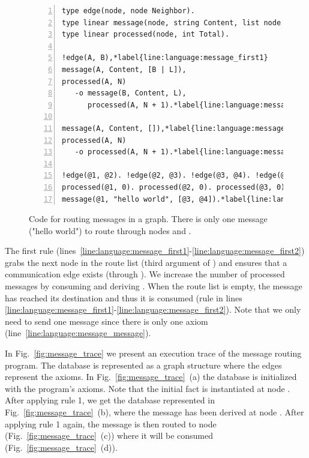 \begin{figure}[h!]
\begin{Verbatim}[numbers=left,commandchars=\*\{\},fontsize=\codesize]
type edge(node, node Neighbor).
type linear message(node, string Content, list node Routing).
type linear processed(node, int Total).

!edge(A, B),*label{line:language:message_first1}
message(A, Content, [B | L]),
processed(A, N)
   -o message(B, Content, L),
      processed(A, N + 1).*label{line:language:message_first2}

message(A, Content, []),*label{line:language:message_second1}
processed(A, N)
   -o processed(A, N + 1).*label{line:language:message_second2}

!edge(@1, @2). !edge(@2, @3). !edge(@3, @4). !edge(@1, @3).
processed(@1, 0). processed(@2, 0). processed(@3, 0). processed(@4, 0).
message(@1, "hello world", [@3, @4]).*label{line:language:message_message}
\end{Verbatim}
\caption{Code for routing messages in a graph. There is only one message ("hello
world") to route through nodes  and .}
\label{code:message}
\end{figure}

The first rule
(lines~\ref{line:language:message_first1}-\ref{line:language:message_first2})
grabs the next node in the route list (third argument of ) and
ensures that a communication edge exists (through ). We
increase the number of processed messages by consuming 
and deriving .  When the route list is empty, the
message has reached its destination and thus it is consumed (rule in lines
\ref{line:language:message_first1}-\ref{line:language:message_first2}).  Note
that we only need to send one message since there is only one 
axiom (line~\ref{line:language:message_message}).

In Fig.~\ref{fig:message_trace} we present an execution trace of the message
routing program.  The database is represented as a graph structure where the
edges represent the  axioms. In Fig.~\ref{fig:message_trace}~(a)
the database is initialized with the program's axioms.  Note that the initial
 fact is instantiated at node . After applying rule 1,
we get the database represented in Fig.~\ref{fig:message_trace}~(b), where
the message has been derived at node . After applying rule 1
again, the message is then routed to node 
(Fig.~\ref{fig:message_trace}~(c)) where it will be consumed
(Fig.~\ref{fig:message_trace}~(d)).

